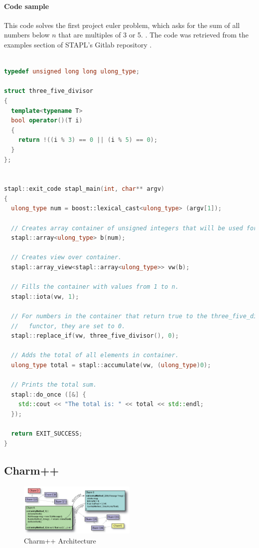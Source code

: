 \paragraph{Code sample}
This code solves the first project euler problem, which asks for the sum of all numbers below $n$ that are multiples of 3 or 5. \cite{euler_1}. The code was retrieved from the examples section of STAPL's Gitlab repository \cite{stapl_gitlab}.  
\scriptsize
\begin{lstlisting}[language=C++, caption=STAPL code sample for Project Euler number 1. Headers and doxygen comments removed for brevity, captionpos=b]

typedef unsigned long long ulong_type;

struct three_five_divisor
{
  template<typename T>
  bool operator()(T i)
  {
    return !((i % 3) == 0 || (i % 5) == 0);
  }
};


stapl::exit_code stapl_main(int, char** argv)
{
  ulong_type num = boost::lexical_cast<ulong_type> (argv[1]);

  // Creates array container of unsigned integers that will be used for storage.
  stapl::array<ulong_type> b(num);

  // Creates view over container.
  stapl::array_view<stapl::array<ulong_type>> vw(b);

  // Fills the container with values from 1 to n.
  stapl::iota(vw, 1);

  // For numbers in the container that return true to the three_five_divisor
  //   functor, they are set to 0.
  stapl::replace_if(vw, three_five_divisor(), 0);

  // Adds the total of all elements in container.
  ulong_type total = stapl::accumulate(vw, (ulong_type)0);

  // Prints the total sum.
  stapl::do_once ([&] {
    std::cout << "The total is: " << total << std::endl;
  });

  return EXIT_SUCCESS;
}
\end{lstlisting}
\normalsize
\subsection{Charm++}
\begin{figure}[h]
	\centering
	\includegraphics[width=0.5\textwidth]{Figures/charm_arch.jpg}
	\caption{Charm++ Architecture \cite{charm_tutorial}}
	\label{fig:charm_arch}
\end{figure}

